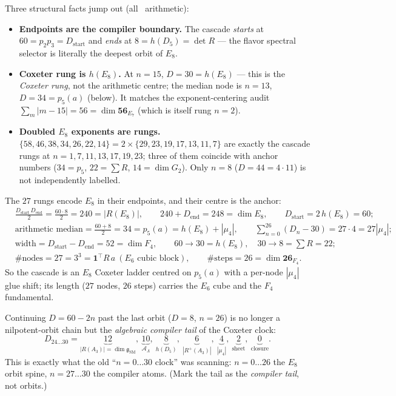 \documentclass[11pt,a4paper]{article}
\newcommand{\AL}{\mathcal A_\Lambda}
\theoremstyle{definition}
\begin{document}
\noindent Three structural facts jump out (all \mE\ arithmetic):
\begin{itemize}[leftmargin=1.4em]
\item \textbf{Endpoints are the compiler boundary.} The cascade \emph{starts} at $60=p_2p_3=D_{\mathrm{start}}$
      and \emph{ends} at $8=h(D_5)=\det R$ --- the flavor spectral selector is literally the deepest
      orbit of $E_8$.
\item \textbf{Coxeter rung is $h(E_8)$.} At $n=15$, $D=30=h(E_8)$ --- this is the \emph{Coxeter rung},
      not the arithmetic centre; the median node is $n=13$, $D=34=p_5(a)$ (below). It matches the
      exponent-centering audit
      $\sum_{m}|m-15|=56=\dim\mathbf{56}_{E_7}$ (which is itself rung $n=2$).
\item \textbf{Doubled $E_8$ exponents are rungs.} $\{58,46,38,34,26,22,14\}=2\times\{29,23,19,17,13,11,7\}$
      are exactly the cascade rungs at $n=1,7,11,13,17,19,23$; three of them coincide with anchor numbers
      ($34=p_5$, $22=\sum R$, $14=\dim G_2$). Only $n=8$ ($D=44=4\cdot11$) is not independently labelled.
\end{itemize}

\begin{winbox}
The $27$ rungs encode $E_8$ in their endpoints, and their centre is the anchor:
\begin{align*}
  &\tfrac{D_{\mathrm{start}}\,D_{\mathrm{end}}}{2}=\tfrac{60\cdot8}{2}=240=|R(E_8)|,\qquad
  240+D_{\mathrm{end}}=248=\dim E_8,\qquad D_{\mathrm{start}}=2\,h(E_8)=60;\\
  &\text{arithmetic median}=\tfrac{60+8}{2}=34=p_5(a)=h(E_8)+|\mu_4|,\qquad
  \textstyle\sum_{n=0}^{26}(D_n-30)=27\cdot4=27|\mu_4|;\\
  &\text{width}=D_{\mathrm{start}}-D_{\mathrm{end}}=52=\dim F_4,\qquad
  60\!\to\!30=h(E_8),\quad 30\!\to\!8=\textstyle\sum R=22;\\
  &\#\text{nodes}=27=3^3=\mathbf 1^\top R\,a\ (E_6\text{ cubic block}),\qquad
  \#\text{steps}=26=\dim\mathbf{26}_{F_4}.
\end{align*}
So the cascade is an $E_8$ Coxeter ladder centred on $p_5(a)$ with a per-node $|\mu_4|$ glue shift; its
length ($27$ nodes, $26$ steps) carries the $E_6$ cube and the $F_4$ fundamental. \mE
\end{winbox}

\begin{keybox}[The IR tail $n=24\ldots30$: the compiler atoms]
Continuing $D=60-2n$ past the last orbit ($D{=}8$, $n{=}26$) is no longer a nilpotent-orbit chain but the
\emph{algebraic compiler tail} of the Coxeter clock:
\[
  D_{24\ldots30}=\underbrace{12}_{|R(A_3)|=\dim\mathfrak g_{\mathrm{SM}}},\
  \underbrace{10}_{\AL},\ \underbrace{8}_{h(D_5)},\
  \underbrace{6}_{|R^+(A_3)|},\ \underbrace{4}_{|\mu_4|},\ \underbrace{2}_{\text{sheet}},\ \underbrace{0}_{\text{closure}} .
\]
This is exactly what the old ``$n=0\ldots30$ clock'' was scanning: $n{=}0\ldots26$ the $E_8$ orbit spine,
$n{=}27\ldots30$ the compiler atoms. (Mark the tail as the \emph{compiler tail}, not orbits.) \mE
\end{keybox}
\end{document}
